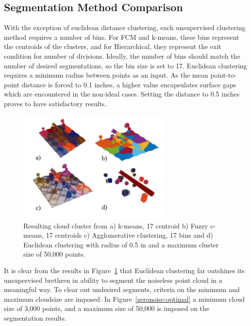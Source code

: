 \documentclass[12pt]{drexelthesis}
\let\Oldsubsection\subsection
\renewcommand{\subsection}{\FloatBarrier\Oldsubsection}
\begin{document}
\subsection{Segmentation Method Comparison}

With the exception of euclidean distance clustering, each unsupervised clustering method requires a number of bins. For FCM and k-means, these bins represent the centroids of the clusters, and for Hierarchical, they represent the exit condition for number of divisions. Ideally, the number of bins should match the number of desired segmentations, so the bin size is set to 17. Euclidean clustering requires a minimum radius between points as an input. As the mean point-to-point distance is forced to 0.1 inches, a higher value encapsulates surface gaps which are encountered in the non-ideal cases. Setting the distance to 0.5 inches proves to have satisfactory results.

\begin{figure}[!ht]
	\label{zeronoise:segcompare}
	\centering
		\includegraphics[width=3in]{simulated-lab-scan/0noise/all_methods.jpg}
		\caption[Comparison of unsupervised segmentation techniques on a simulated dataset.]{\centering Resulting cloud cluster from a) k-means, 17 centroid b) Fuzzy c-means, 17 centroids c) Agglomerative clustering, 17 bins and d) Euclidean clustering with radius of 0.5 in and a maximum cluster size of 50,000 points.}
	\label{zeronoise:compare}
\end{figure}

It is clear from the results in Figure~\ref{zeronoise:compare} that Euclidean clustering far outshines its unsupervised brethren in ability to segment the noiseless point cloud in a meaningful way. To clear out undesired segments, criteria on the minimum and maximum cloudsize are imposed. In Figure~\ref{zeronoise:optimal} a minimum cloud size of 3,000 points, and a maximum size of 50,000 is imposed on the segmentation results.
\end{document}
